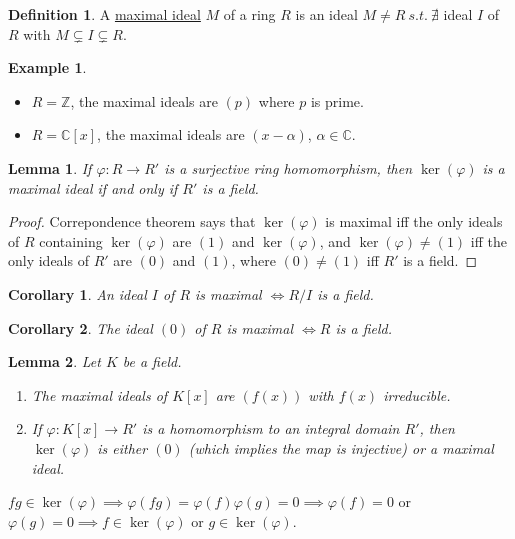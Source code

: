 \documentclass{article}
\newcommand{\C}{\mathbb{C}}
\newcommand{\Z}{\mathbb{Z}}
\newcommand{\st}{\ s.t.\ }
\newtheorem*{corollary}{Corollary}
\newtheorem*{lemma}{Lemma}
\theoremstyle{definition}
\newtheorem*{definition}{Definition}
\newtheorem*{example}{Example}
\theoremstyle{remark}
\begin{document}
\begin{definition}
    A \underline{maximal ideal} $M$ of a ring $R$ is an ideal $M \neq R \st \nexists$ ideal $I$ of $R$ with $M \subsetneq I \subsetneq R$.
\end{definition}

\begin{example}
    \begin{itemize}
        \item $R = \Z$, the maximal ideals are $(p)$ where $p$ is prime.
        \item $R = \C[x]$, the maximal ideals are $(x - \alpha)$, $\alpha \in \C$.
    \end{itemize}
\end{example}

\begin{lemma}
    If $\varphi: R \to R'$ is a surjective ring homomorphism, then $\ker(\varphi)$ is a maximal ideal if and only if $R'$ is a field.
\end{lemma}

\begin{proof}
    Correpondence theorem says that $\ker(\varphi)$ is maximal iff the only ideals of $R$ containing $\ker(\varphi)$ are $(1)$ and $\ker(\varphi)$, and $\ker(\varphi) \neq (1)$ iff the only ideals of $R'$ are $(0)$ and $(1)$, where $(0) \neq (1)$ iff $R'$ is a field.
\end{proof}

\begin{corollary}
    An ideal $I$ of $R$ is maximal $\iff R/I$ is a field. 
\end{corollary}
\begin{corollary}
    The ideal $(0)$ of $R$ is maximal $\iff R$ is a field. 
\end{corollary}

\begin{lemma}
    Let $K$ be a field.
    \begin{enumerate}
        \item The maximal ideals of $K[x]$ are $(f(x))$ with $f(x)$ irreducible.
        \item If $\varphi: K[x] \to R'$ is a homomorphism to an integral domain $R'$, then $\ker(\varphi)$ is either $(0)$ (which implies the map is injective) or a maximal ideal.
    \end{enumerate}
\end{lemma}

$fg \in \ker(\varphi) \implies \varphi(fg) = \varphi(f)\varphi(g) = 0 \implies \varphi(f) = 0$ or $\varphi(g) = 0 \implies f \in \ker(\varphi)$ or $g \in \ker(\varphi)$.
\end{document}
